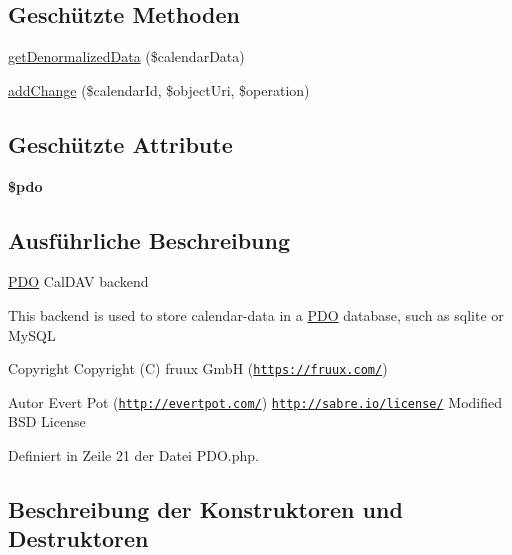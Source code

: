 \subsection*{Geschützte Methoden}
\begin{DoxyCompactItemize}
\item 
\mbox{\hyperlink{class_sabre_1_1_cal_d_a_v_1_1_backend_1_1_p_d_o_af50966457ed8b0b9fd65e2ef70f3f415}{get\+Denormalized\+Data}} (\$calendar\+Data)
\item 
\mbox{\hyperlink{class_sabre_1_1_cal_d_a_v_1_1_backend_1_1_p_d_o_a45f3b269b8cf0d8e049cb321af846ebd}{add\+Change}} (\$calendar\+Id, \$object\+Uri, \$operation)
\end{DoxyCompactItemize}
\subsection*{Geschützte Attribute}
\begin{DoxyCompactItemize}
\item 
\mbox{\label{class_sabre_1_1_cal_d_a_v_1_1_backend_1_1_p_d_o_a422879d91ffb9d866187bb97be3a73b0}} 
{\bfseries \$pdo}
\end{DoxyCompactItemize}


\subsection{Ausführliche Beschreibung}
\mbox{\hyperlink{class_sabre_1_1_cal_d_a_v_1_1_backend_1_1_p_d_o}{P\+DO}} Cal\+D\+AV backend

This backend is used to store calendar-\/data in a \mbox{\hyperlink{class_sabre_1_1_cal_d_a_v_1_1_backend_1_1_p_d_o}{P\+DO}} database, such as sqlite or My\+S\+QL

\begin{DoxyCopyright}{Copyright}
Copyright (C) fruux GmbH (\href{https://fruux.com/}{\tt https\+://fruux.\+com/}) 
\end{DoxyCopyright}
\begin{DoxyAuthor}{Autor}
Evert Pot (\href{http://evertpot.com/}{\tt http\+://evertpot.\+com/})  \href{http://sabre.io/license/}{\tt http\+://sabre.\+io/license/} Modified B\+SD License 
\end{DoxyAuthor}


Definiert in Zeile 21 der Datei P\+D\+O.\+php.



\subsection{Beschreibung der Konstruktoren und Destruktoren}
\mbox{\label{class_sabre_1_1_cal_d_a_v_1_1_backend_1_1_p_d_o_a7bfb5fe0cf083acd9194e94e474e0918}} 
